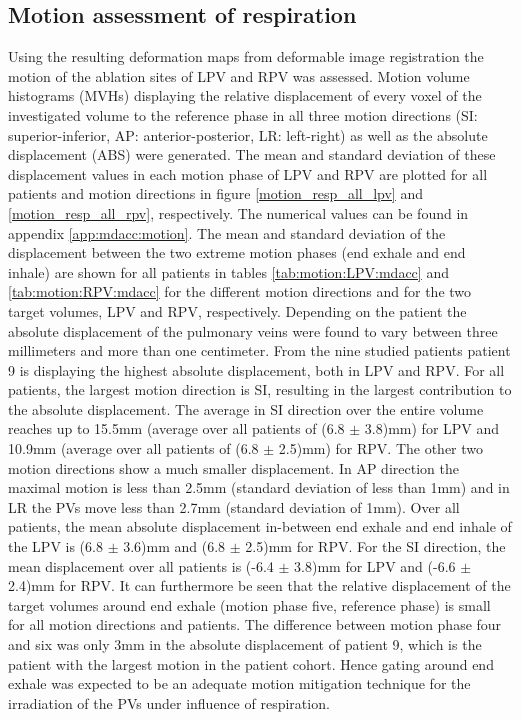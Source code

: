 \subsection{Motion assessment of respiration}
\label{motion}
Using the resulting deformation maps from deformable image registration the motion of the ablation sites of LPV and RPV was assessed. Motion 
volume histograms (MVHs) \cite{Ric13} displaying the relative displacement of every voxel of the investigated volume to the reference phase 
in all three motion directions (SI: superior-inferior, AP: anterior-posterior, LR: left-right) as well as the absolute displacement (ABS) 
were generated. The mean and standard deviation of these displacement values in each motion phase of LPV and RPV are plotted for all patients 
and motion directions in figure \ref{motion_resp_all_lpv} and \ref{motion_resp_all_rpv}, respectively. The numerical values can be found 
in appendix \ref{app:mdacc:motion}. \newline
\newline
The mean and standard deviation of the displacement between the two extreme motion phases (end exhale and end inhale) are shown for all 
patients in tables \ref{tab:motion:LPV:mdacc} and \ref{tab:motion:RPV:mdacc} for the different motion directions and for the two target volumes, LPV and 
RPV, respectively. 
Depending on the patient the absolute displacement of the pulmonary veins were found to vary between three millimeters and more than 
one centimeter. From the nine studied patients patient 9 is displaying the highest absolute displacement, both in LPV and RPV.
For all patients, the largest motion direction is SI, resulting in the largest contribution to the absolute displacement. The 
average in SI direction over the entire volume reaches up to 15.5mm (average over all patients of (6.8 $\pm$ 3.8)mm) for LPV and 10.9mm 
(average over all patients of (6.8 $\pm$ 2.5)mm) for RPV. The other two motion directions show a much smaller displacement. In AP direction the maximal 
motion is less than 2.5mm (standard deviation of less than 1mm) and in LR the PVs move less than 2.7mm (standard deviation of 1mm).
Over all patients, the mean absolute displacement in-between end exhale and end inhale of the LPV is (6.8 $\pm$ 3.6)mm and 
(6.8 $\pm$ 2.5)mm for RPV. For the SI direction, the mean displacement over all patients is (-6.4 $\pm$ 3.8)mm for LPV and (-6.6 $\pm$ 2.4)mm for 
RPV.\newline
\newline
It can furthermore be seen that the relative displacement of the target volumes around end exhale (motion phase five, reference phase) is small 
for all motion directions and patients. The difference between motion phase four and six was only 3mm in the absolute displacement 
of patient 9, which is the patient with the largest motion in the patient cohort. Hence gating around end exhale was expected to be an 
adequate motion mitigation technique for the irradiation of the PVs under influence of respiration. 


